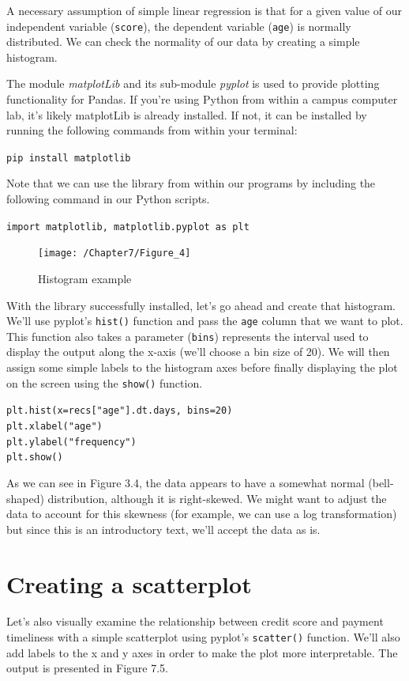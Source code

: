 \documentclass{book}
\begin{document}
A necessary assumption of simple linear regression is that for a given value of our independent variable (\texttt{score}), the dependent variable (\texttt{age}) is normally distributed. We can check the normality of our data by creating a simple histogram.

The module \textit{matplotLib} and its sub-module \textit{pyplot} is used to provide plotting functionality for Pandas. If you're using Python from within a campus computer lab, it's likely matplotLib is already installed. If not, it can be installed by running the following commands from within your terminal:

\texttt{pip install matplotlib}

Note that we can use the library from within our programs by including the following command in our Python scripts.

\texttt{import matplotlib, matplotlib.pyplot as plt}

\begin{figure}[h]
	\caption{Histogram example}
	\centering\texttt{[image: /Chapter7/Figure\_4]}
\end{figure}

With the library successfully installed, let's go ahead and create that histogram. We'll use pyplot's \texttt{hist()} function and pass the \texttt{age} column that we want to plot. This function also takes a parameter (\texttt{bins}) represents the interval used to display the output along the x-axis (we'll choose a bin size of 20). We will then assign some simple labels to the histogram axes before finally displaying the plot on the screen using the \texttt{show()} function.

\texttt{plt.hist(x=recs["age"].dt.days, bins=20) \\
plt.xlabel("age") \\
plt.ylabel("frequency") \\
plt.show()}

As we can see in Figure 3.4, the data appears to have a somewhat normal (bell-shaped) distribution, although it is right-skewed. We might want to adjust the data to account for this skewness (for example, we can use a log transformation) but since this is an introductory text, we'll accept the data as is. 

\section{Creating a scatterplot}

Let's also visually examine the relationship between credit score and payment timeliness with a simple scatterplot using pyplot's \texttt{scatter()} function. We'll also add labels to the x and y axes in order to make the plot more interpretable. The output is presented in Figure 7.5.
\end{document}
